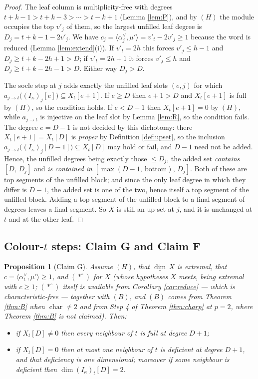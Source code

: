\documentclass[reqno]{amsart}
\theoremstyle{plain}
\newtheorem{proposition}[theorem]{Proposition}
\theoremstyle{definition}
\newcommand{\dimv}{\underline{\dim}\,}
\newcommand{\al}{\alpha}
\newcommand{\ka}{\kappa}
\begin{document}
\begin{proof}
The leaf column is multiplicity-free with degrees $t+k-1>t+k-3>\cdots>t-k+1$
(Lemma \ref{lem:P}), and by $(H)$ the module occupies the top $v'_j$ of them,
so the largest unfilled leaf degree is $D_j=t+k-1-2v'_j$.  We have
$c_j=\langle\al_j^\vee,\mu'\rangle=v'_t-2v'_j\ge1$ because the word is reduced
(Lemma \ref{lem:extend}(i)).  If $v'_t=2h$ this forces $v'_j\le h-1$ and
$D_j\ge t+k-2h+1>D$; if $v'_t=2h+1$ it forces $v'_j\le h$ and
$D_j\ge t+k-2h-1>D$.  Either way $D_j>D$.

The socle step at $j$ adds exactly the unfilled leaf slots $(e,j)$ for which
$a_{j\to t}\bigl((I_\ka)_j[e]\bigr)\subseteq X_t[e+1]$.  If $e\ge D$ then
$e+1>D$ and $X_t[e+1]$ is full by $(H)$, so the condition holds.  If
$e<D-1$ then $X_t[e+1]=0$ by $(H)$, while $a_{j\to t}$ is injective on the leaf
slot by Lemma \ref{lem:R}, so the condition fails.  The degree $e=D-1$ is not
decided by this dichotomy: there $X_t[e+1]=X_t[D]$ is \emph{proper} by
Definition \ref{def:upset}, so the inclusion
$a_{j\to t}\bigl((I_\ka)_j[D-1]\bigr)\subseteq X_t[D]$ may hold or fail, and
$D-1$ need not be added.  Hence, the unfilled degrees being exactly those
$\le D_j$, the added set \emph{contains} $[D,\,D_j]$ and \emph{is contained
in} $[\max(D-1,\ \text{bottom}),\,D_j]$.  Both of these are top segments of
the unfilled block; and since the only leaf degree in which they differ is
$D-1$, the added set is one of the two, hence itself a top segment of the
unfilled block.
Adding a top segment of the unfilled block to a final segment of degrees leaves
a final segment.  So $X$ is still an up-set at $j$, and it is unchanged at $t$
and at the other leaf.
\end{proof}

\subsection{Colour-\texorpdfstring{$t$}{t} steps: Claim G and Claim F}
\label{ss:G}

\begin{proposition}[Claim G]\label{prop:G}
Assume $(H)$, that $\dimv X$ is extremal, that
$c=\langle\al_t^\vee,\mu'\rangle\ge1$, and $(*^\circ)$ for $X$ \textup{(}whose
hypotheses $X$ meets, being extremal with $c\ge1$; $(*^\circ)$ itself is
available from Corollary \ref{cor:reduce} --- which is characteristic-free ---
together with $(B)$, and $(B)$ comes from Theorem \ref{thm:B} when
$\operatorname{char}\ne2$ and from Step 4 of Theorem \ref{thm:charp} at
$p=2$, where Theorem \ref{thm:B} is not claimed\textup{)}.  Then:
\begin{itemize}\itemsep1pt
\item[\textup{(G1)}] if $X_t[D]\ne0$ then every neighbour of $t$ is full at
degree $D+1$;
\item[\textup{(G2)}] if $X_t[D]=0$ then at most one neighbour of $t$ is
deficient at degree $D+1$, and that deficiency is one dimensional; moreover if
some neighbour is deficient then $\dim(I_\ka)_t[D]=2$.
\end{itemize}
\end{proposition}
\end{document}
